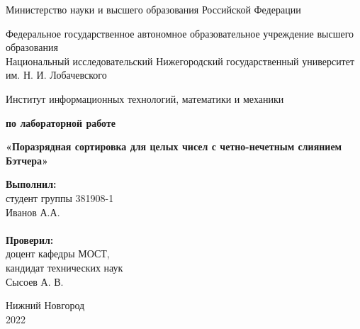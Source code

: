 \documentclass{report}
\begin{document}
\begin{titlepage}

\begin{center}
Министерство науки и высшего образования Российской Федерации
\end{center}

\begin{center}
Федеральное государственное автономное образовательное учреждение высшего образования \\
Национальный исследовательский Нижегородский государственный университет им. Н. И. Лобачевского
\end{center}

\begin{center}
Институт информационных технологий, математики и механики
\end{center}

\vspace{4em}

\begin{center}
\textbf{ по лабораторной работе} \\
\end{center}
\begin{center}
\textbf{\Large«Поразрядная сортировка для целых чисел с четно-нечетным слиянием Бэтчера»} \\
\end{center}

\vspace{4em}

\newbox{\lbox}
\newlength{\maxl}
\setlength{\maxl}{\wd\lbox}
\hfill\parbox{7cm}{
\hspace*{5cm}\hspace*{-5cm}\textbf{Выполнил:}
\\ студент группы 381908-1
\\ Иванов А.А.
\\\\
\hspace*{5cm}\hspace*{-5cm}\textbf{Проверил:}
\\ доцент кафедры МОСТ,
\\ кандидат технических наук
\\ Сысоев А. В.\\
}
\vspace{\fill}

\begin{center} Нижний Новгород \\ 2022 \end{center}

\end{titlepage}
\end{document}
